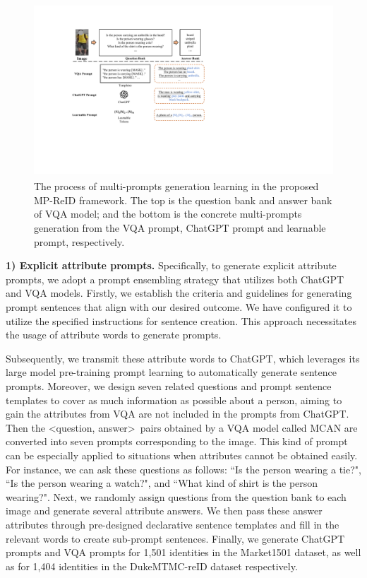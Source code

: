 \documentclass[letterpaper]{article} %
\begin{document}
\begin{figure}[t]
    \centering
    \label{frameprompt}
    \includegraphics[width=\linewidth,height=6.5cm]{prompts.pdf}
    \caption{The process of multi-prompts generation learning in the proposed MP-ReID framework. The top is the question bank and answer bank of VQA model; and the bottom is the concrete multi-prompts generation from the VQA prompt, ChatGPT prompt and learnable prompt, respectively.}
    \label{frameprompt}
\end{figure}

\textbf{1) Explicit attribute prompts.} Specifically, to generate explicit attribute prompts, we adopt a prompt ensembling strategy that utilizes both ChatGPT and VQA models. Firstly, we establish the criteria and guidelines for generating prompt sentences that align with our desired outcome. We have configured it to utilize the specified instructions for sentence creation. This approach necessitates the usage of attribute words to generate prompts.

Subsequently, we transmit these attribute words to ChatGPT, which leverages its large model pre-training prompt learning to automatically generate sentence prompts. Moreover, we design 
seven related questions and prompt sentence templates to cover as much information as possible about a person, aiming to gain the attributes from VQA are not included in the prompts from ChatGPT. Then the \textless question, answer\textgreater~pairs obtained by a VQA model called MCAN \cite{yu2019mcan} are converted into seven prompts corresponding to the image. This kind of prompt can be especially applied to situations when attributes cannot be obtained easily. For instance, we can ask these questions as follows: ``Is the person wearing a tie?", ``Is the person wearing a watch?", and ``What kind of shirt is the person wearing?". Next, we randomly assign questions from the question bank to each image and generate several attribute answers. We then pass these answer attributes through pre-designed declarative sentence templates and fill in the relevant words to create sub-prompt sentences. Finally, we generate ChatGPT prompts and VQA prompts for 1,501 identities in the Market1501 dataset, as well as for 1,404 identities in the DukeMTMC-reID dataset respectively.
\end{document}
